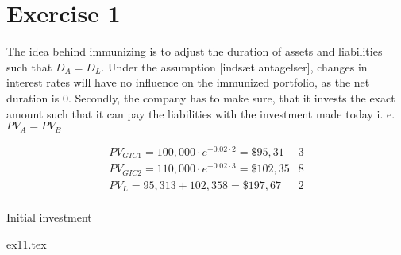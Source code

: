 
\section*{Exercise 1}

The idea behind immunizing is to adjust the duration of assets and liabilities such that $D_{A}=D_{L}$. Under the assumption [indsæt antagelser], changes in interest rates will have no influence on the immunized portfolio, as the net duration is 0. Secondly, the company has to make sure, that it invests the exact amount such that it can pay the liabilities with the investment made today i. e. $PV_A = PV_B$

\begin{align*}
PV_{GIC1} = 100,000\cdot e^{-0.02\cdot 2} = \$ 95,31&3 \\
PV_{GIC2} = 110,000\cdot e^{-0.02\cdot 3} = \$ 102,35&8 \\
PV_{L} = 95,313 + 102,358 = \$ 197,67&2 \\
\end{align*}

\begin{table}
\centering
\caption{Initial investment}
\label{tab:initial_investment}
{ex11.tex}
\end{table}
